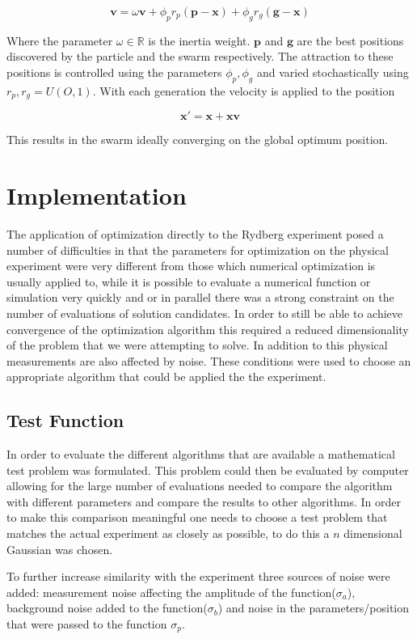 \documentclass[a4paper,titlepage]{report}
\begin{document}
\[ \mathbf{v} = \omega \mathbf{v} + \phi_p r_p (\mathbf{p} - \mathbf{x}) + \phi_g r_g (\mathbf{g} - \mathbf{x}) \]

Where the parameter $\omega \in \mathbb{R}$ is the inertia weight. $\mathbf{p}$ and $\mathbf{g}$ are the best positions discovered by the particle and the swarm respectively. The attraction to these positions is controlled using the parameters $\phi_p, \phi_g$ and varied stochastically using $r_p,r_g = U(O,1)$. With each generation the velocity is applied to the position

\[\mathbf{x}' = \mathbf{x} + \mathbf{x} \mathbf{v} \]

This results in the swarm ideally converging on the global optimum position.




\chapter{Implementation}

The application of optimization directly to the Rydberg experiment posed a number of difficulties in that the parameters for optimization on the physical experiment were very different from those which numerical optimization is usually applied to, while it is possible to evaluate a numerical function or simulation very quickly and or in parallel there was a strong constraint on the number of evaluations of solution candidates. In order to still be able to achieve convergence of the optimization algorithm this required a reduced dimensionality of the problem that we were attempting to solve. In addition to this physical measurements are also affected by noise. These conditions were used to choose an appropriate algorithm that could be applied the the experiment.

\section{Test Function}
In order to evaluate the different algorithms that are available a mathematical test problem was formulated. This problem could then be evaluated by computer allowing for the large number of evaluations needed to compare the algorithm with different parameters and compare the results to other algorithms. In order to make this comparison meaningful one needs to choose a test problem that matches the actual experiment as closely as possible, to do this a $n$ dimensional Gaussian was chosen.

To further increase similarity with the experiment three sources of noise were added: measurement noise affecting the amplitude of the function($\sigma_a$), background noise added to the function($\sigma_b$) and noise in the parameters/position that were passed to the function $\sigma_p$. 
\end{document}
